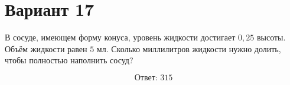 \documentclass[12pt,a4paper]{article}
\begin{document}
\section*{Вариант 17}

В сосуде, имеющем форму конуса, уровень жидкости достигает
\(0{,}25\) высоты. Объём жидкости равен \(5\) мл.
Сколько миллилитров жидкости нужно долить, чтобы полностью
наполнить сосуд?

\begin{center}
\end{center}

\[
\boxed{\text{Ответ: }315}
\]
\end{document}
